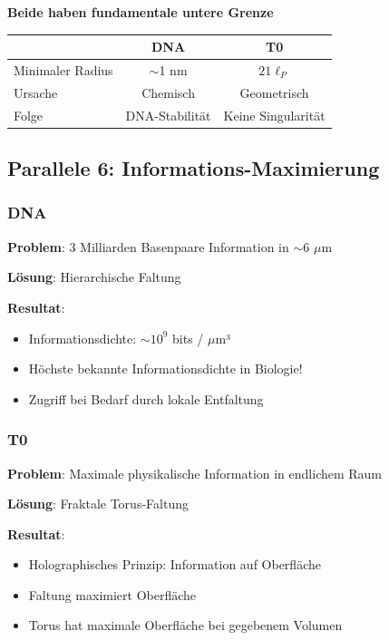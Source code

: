 	\begin{keyresult}
		\textbf{Beide haben fundamentale untere Grenze}
		
		\begin{table}[H]
			\centering
			\begin{tabular}{lcc}
				\toprule
				& \textbf{DNA} & \textbf{T0} \\
				\midrule
				Minimaler Radius & $\sim$1 nm & $21\ell_P$ \\
				Ursache & Chemisch & Geometrisch \\
				Folge & DNA-Stabilität & Keine Singularität \\
				\bottomrule
			\end{tabular}
		\end{table}
	\end{keyresult}
	
	\subsection{Parallele 6: Informations-Maximierung}
	
	\subsubsection{DNA}
	
	\textbf{Problem}: 3 Milliarden Basenpaare Information in $\sim$6 $\mu$m
	
	\textbf{Lösung}: Hierarchische Faltung
	
	\textbf{Resultat}:
	\begin{itemize}
		\item Informationsdichte: $\sim 10^{9}$ bits / $\mu$m³
		\item Höchste bekannte Informationsdichte in Biologie!
		\item Zugriff bei Bedarf durch lokale Entfaltung
	\end{itemize}
	
	\subsubsection{T0}
	
	\textbf{Problem}: Maximale physikalische Information in endlichem Raum
	
	\textbf{Lösung}: Fraktale Torus-Faltung
	
	\textbf{Resultat}:
	\begin{itemize}
		\item Holographisches Prinzip: Information auf Oberfläche
		\item Faltung maximiert Oberfläche
		\item Torus hat maximale Oberfläche bei gegebenem Volumen
	\end{itemize}
	
